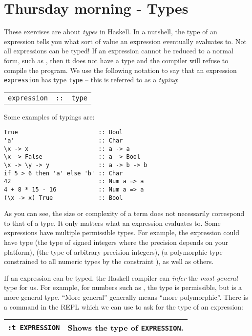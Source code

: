\section{Thursday morning - Types}


These exercises are about \emph{types} in Haskell. In a nutshell, the type of an expression tells you what sort of value an expression eventually evaluates to. Not all expressions can be typed! If an expression cannot be reduced to a normal form, such as , then it does not have a type and the compiler will refuse to compile the program. We use the following notation to say that an expression \texttt{\small expression} has type \texttt{\small type} -- this is referred to as a \emph{typing}:
\begin{center}
	\begin{tabular}{lcl}
		\texttt{\small expression} & \texttt{\small ::} & \texttt{\small type}
	\end{tabular}
\end{center}
Some examples of typings are:
\begin{verbatim}
True                       :: Bool
'a'                        :: Char 
\x -> x                    :: a -> a
\x -> False                :: a -> Bool 
\x -> \y -> y              :: a -> b -> b
if 5 > 6 then 'a' else 'b' :: Char 
42                         :: Num a => a
4 + 8 * 15 - 16            :: Num a => a
(\x -> x) True             :: Bool
\end{verbatim}
As you can see, the size or complexity of a term does not necessarily correspond to that of a type. It only matters what an expression evaluates to. Some expressions have multiple permissible types. For example, the expression  could have type  (the type of signed integers where the precision depends on your platform),  (the type of arbitrary precision integers),  (a polymorphic type  constrained to all numeric types by the constraint ), as well as others.

If an expression can be typed, the Haskell compiler can \emph{infer} the \emph{most general} type for us. For example, for numbers such as , the  type is permissible, but  is a more general type. ``More general'' generally means ``more polymorphic''. There is a command in the REPL which we can use to ask for the type of an expression:
\begin{center}
\begin{tabular}{|l|l|}
	\hline 
	\texttt{\small :t EXPRESSION}   & Shows the type of \texttt{\small EXPRESSION}. \\ 
	\hline 
\end{tabular}  
\end{center}

